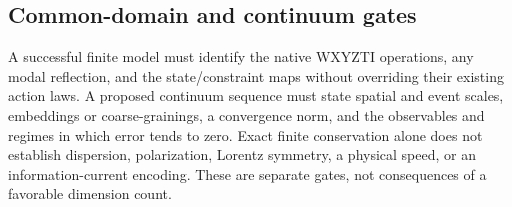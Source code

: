 \subsection{Common-domain and continuum gates}
A successful finite model must identify the native WXYZTI operations, any modal reflection, and the state/constraint maps without overriding their existing action laws. A proposed continuum sequence must state spatial and event scales, embeddings or coarse-grainings, a convergence norm, and the observables and regimes in which error tends to zero. Exact finite conservation alone does not establish dispersion, polarization, Lorentz symmetry, a physical speed, or an information-current encoding. These are separate gates, not consequences of a favorable dimension count.
